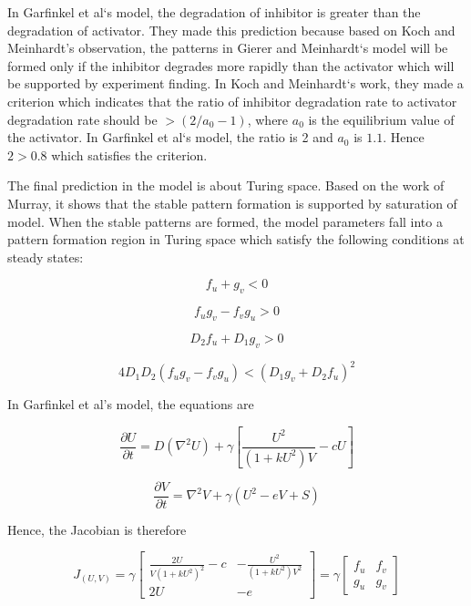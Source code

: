 \documentclass[12pt]{article}
\begin{document}
In Garfinkel et al‘s model, the degradation of inhibitor is greater than the degradation of activator. They made this prediction because based on Koch and Meinhardt’s observation, the patterns in Gierer and Meinhardt‘s model will be formed only if the inhibitor degrades more rapidly than the activator which will be supported by experiment finding. In Koch and Meinhardt‘s work, they made a criterion which indicates that the ratio of inhibitor degradation rate to activator degradation rate should be $>(2/a_0-1)$, where $a_0$ is the equilibrium value of the activator. In Garfinkel et al‘s model, the ratio is 2 and $a_0$ is $1.1$. Hence $2>0.8$ which satisfies the criterion.

The final prediction in the model is about Turing space. Based on the work of Murray, it shows that the stable pattern formation is supported by saturation of model. When the stable patterns are formed, the model parameters fall into a pattern formation region in Turing space which satisfy the following conditions at steady states:

\begin{equation}
	f_u + g_v < 0
	\label{eq:3}
\end{equation}

\begin{equation}
f_{u}g_{v}-f_{v}g_{u} > 0 
	\label{eq:4}
\end{equation}

\begin{equation}
	D_{2}f_{u} + D_{1}g_{v} > 0
		\label{eq:5}
\end{equation}

\begin{equation}
	4D_{1}D_{2}(f_{u}g_{v}-f_{v}g_{u})<(D_{1}g_{v}+D_{2}f_{u})^2
		\label{eq:6}
\end{equation}

In Garfinkel et al's model, the equations are 

\begin{equation*}
	\frac{\partial U}{\partial t}=D(\nabla^{2}U)+\gamma[\frac{U^2}{(1+kU^2)V}-cU]
\end{equation*}

\begin{equation*}
	\frac{\partial V}{\partial t}=\nabla^{2}V+\gamma(U^2-eV+S)
\end{equation*}

Hence, the Jacobian is therefore 

\begin{equation*}
	J_{(U,V)}=\gamma \begin{bmatrix}
	\frac{2U}{V(1+kU^2)^2}-c & -\frac{U^2}{(1+kU^2)V^2}\\
	2U & -e
	\end{bmatrix}
	= \gamma \begin{bmatrix}
	f_u & f_v\\ 
	g_u & g_v
	\end{bmatrix}
\end{equation*}
\end{document}

